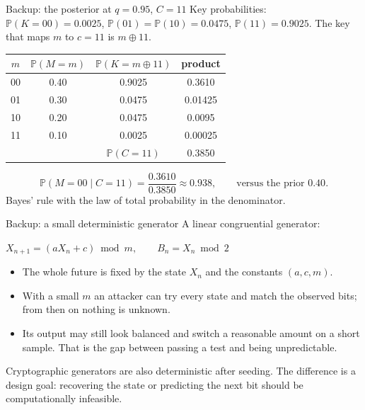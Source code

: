\documentclass[11pt,aspectratio=169]{beamer}
\newcommand{\Prob}[1]{\mathbb{P}\!\left(#1\right)}
\newcommand{\msg}{M}
\newcommand{\key}{K}
\newcommand{\ctxt}{C}
\newcommand{\xor}{\oplus}
\newcommand{\keyeq}[1]{\begin{center}\large\color{deep}$\displaystyle #1$\end{center}}
\begin{document}
\begin{frame}{Backup: the posterior at $q=0.95$, $\ctxt=11$}
  Key probabilities: $\Prob{\key=00}=0.0025$, $\Prob{01}=\Prob{10}=0.0475$,
  $\Prob{11}=0.9025$. The key that maps $m$ to $c=11$ is $m\xor11$.
  \begin{center}
    \begin{tabular}{@{}cccc@{}}
      \toprule
      $m$ & $\Prob{\msg=m}$ & $\Prob{\key=m\xor11}$ & product \\
      \midrule
      00 & 0.40 & 0.9025 & 0.3610 \\
      01 & 0.30 & 0.0475 & 0.01425 \\
      10 & 0.20 & 0.0475 & 0.0095 \\
      11 & 0.10 & 0.0025 & 0.00025 \\
      \midrule
      & & $\Prob{\ctxt=11}$ & 0.3850 \\
      \bottomrule
    \end{tabular}
  \end{center}
  \[\Prob{\msg=00\mid\ctxt=11}=\frac{0.3610}{0.3850}\approx0.938,
    \qquad\text{versus the prior }0.40.\]
  Bayes' rule with the law of total probability in the denominator.
\end{frame}

\begin{frame}{Backup: a small deterministic generator}
  A linear congruential generator:
  \keyeq{X_{n+1}=(aX_n+c)\bmod m,\qquad B_n=X_n\bmod 2}
  \begin{itemize}
    \item The whole future is fixed by the state $X_n$ and the constants
          $(a,c,m)$.
    \item With a small $m$ an attacker can try every state and match the
          observed bits; from then on nothing is unknown.
    \item Its output may still look balanced and switch a reasonable amount
          on a short sample. That is the gap between passing a test and
          being unpredictable.
  \end{itemize}
  \medskip
  Cryptographic generators are also deterministic after seeding. The
  difference is a design goal: recovering the state or predicting the next
  bit should be computationally infeasible.
\end{frame}
\end{document}
